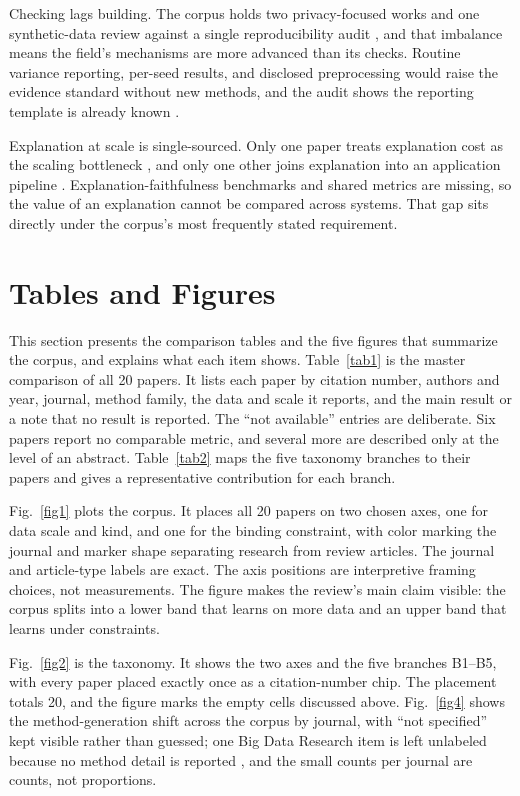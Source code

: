 \documentclass[pdflatex,sn-basic,Numbered]{sn-jnl}%
\begin{document}
Checking lags building. The corpus holds two privacy-focused works and one synthetic-data review against a single reproducibility audit \citep{haripriya2025privacy,waseem2025synthetic,vats2026survey}, and that imbalance means the field's mechanisms are more advanced than its checks. Routine variance reporting, per-seed results, and disclosed preprocessing would raise the evidence standard without new methods, and the audit shows the reporting template is already known \citep{vats2026survey}.

Explanation at scale is single-sourced. Only one paper treats explanation cost as the scaling bottleneck \citep{jiang2026pexp}, and only one other joins explanation into an application pipeline \citep{mohammadian2025explainable}. Explanation-faithfulness benchmarks and shared metrics are missing, so the value of an explanation cannot be compared across systems. That gap sits directly under the corpus's most frequently stated requirement.

\section{Tables and Figures}\label{sec3}

This section presents the comparison tables and the five figures that summarize the corpus, and explains what each item shows. Table~\ref{tab1} is the master comparison of all 20 papers. It lists each paper by citation number, authors and year, journal, method family, the data and scale it reports, and the main result or a note that no result is reported. The ``not available'' entries are deliberate. Six papers report no comparable metric, and several more are described only at the level of an abstract. Table~\ref{tab2} maps the five taxonomy branches to their papers and gives a representative contribution for each branch.

Fig.~\ref{fig1} plots the corpus. It places all 20 papers on two chosen axes, one for data scale and kind, and one for the binding constraint, with color marking the journal and marker shape separating research from review articles. The journal and article-type labels are exact. The axis positions are interpretive framing choices, not measurements. The figure makes the review's main claim visible: the corpus splits into a lower band that learns on more data and an upper band that learns under constraints.

Fig.~\ref{fig2} is the taxonomy. It shows the two axes and the five branches B1--B5, with every paper placed exactly once as a citation-number chip. The placement totals 20, and the figure marks the empty cells discussed above. Fig.~\ref{fig4} shows the method-generation shift across the corpus by journal, with ``not specified'' kept visible rather than guessed; one Big Data Research item is left unlabeled because no method detail is reported \citep{ghodsi2026opinion}, and the small counts per journal are counts, not proportions.
\end{document}
